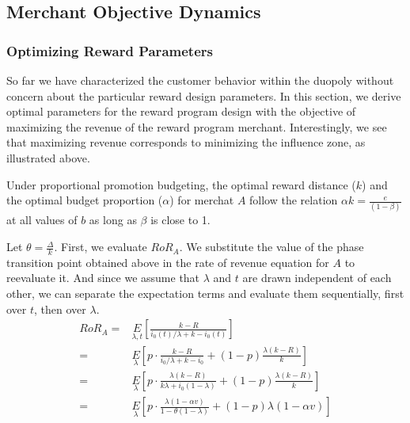 

\subsection{Merchant Objective Dynamics}

\subsubsection{Optimizing Reward Parameters}

So far we have characterized the customer behavior within the duopoly without concern about the particular reward design parameters. 
In this section, we derive optimal parameters for the reward program design with the objective of maximizing the revenue of the reward program merchant. 
Interestingly, we see that maximizing revenue corresponds to minimizing the influence zone, as illustrated above.

\begin{theorem}
Under proportional promotion budgeting, the optimal reward distance ($k$) and the optimal budget proportion ($\alpha$) for merchat $A$ follow the relation $\alpha k = \frac{e}{(1-\beta)}$ at all values of $b$ as long as $\beta$ is close to 1.
\end{theorem}
\proof
Let $\theta = \frac{\Delta}{k}$. First, we evaluate $RoR_A$.
We substitute the value of the phase transition point obtained above in the rate of revenue equation for $A$ to reevaluate it. 
And since we assume that $\lambda$ and $t$ are drawn independent of each other, we can separate the expectation terms and evaluate them sequentially, first over $t$, then over $\lambda$.
\begin{align*}
RoR_A =& \underset{\lambda, t}E\left[\frac{k-R}{i_0(t)/\lambda + k - i_0(t)}\right]\\
                                       =& \underset{\lambda}E\left[p\cdot\frac{k-R}{i_0/\lambda + k - i_0} + (1-p)\frac{\lambda(k-R)}{k}\right]\\
                                       =& \underset{\lambda}E\left[p\cdot\frac{\lambda(k-R)}{k\lambda + i_0(1-\lambda)} + (1-p)\frac{\lambda(k-R)}{k}\right]\\
                                       =& \underset{\lambda}E\left[p\cdot\frac{\lambda(1-\alpha v)}{1-\theta(1-\lambda)} + (1-p)\lambda (1-\alpha v)\right]\\
\end{align*}

